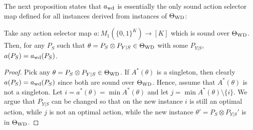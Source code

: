 The next proposition states that $a_{\mathrm{wd}}$ is essentially the only sound action selector map defined for
all instances derived from instances of $\Theta_{\mathrm{WD}}$:

\begin{prop}\label{prop:awdunique}
	Take any action selector map $a: M_1( \{0,1\}^K ) \to [K]$ which is sound over $\Theta_{\mathrm{WD}}$.
	Then, for any $P_S$ such that $\theta = P_S\otimes P_{Y|S}\in \Theta_{\mathrm{WD}}$ with some $P_{Y|S}$,
	$a(P_S) = a_{\mathrm{wd}}(P_S)$.
\end{prop}
\begin{proof}
	Pick any $\theta = P_S\otimes P_{Y|S}\in \Theta_{\mathrm{WD}}$. If $A^*(\theta)$ is a singleton, then clearly $a(P_S) = a_{\mathrm{wd}}(P_S)$ since both are sound over $\Theta_{\mathrm{WD}}$.
	Hence, assume that $A^*(\theta)$ is not a singleton.
	Let $i = a^*(\theta) = \min A^*(\theta)$ and let $j = \min A^*(\theta) \setminus \{ i \}$.
	We argue that $P_{Y|S}$ can be changed so that on the new instance $i$ is still an optimal action, while
	$j$ is not an optimal action, while the new instance $\theta' = P_S \otimes P_{Y|S}'$ is in $\Theta_{\mathrm{WD}}$.
	

\end{proof}
